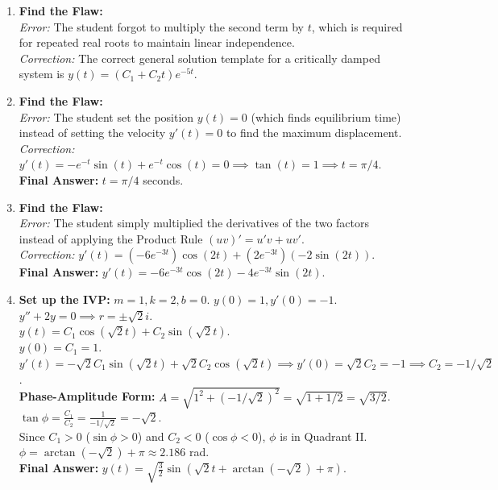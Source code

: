 \documentclass[11pt]{article}
\begin{document}
\begin{enumerate}[label=\textbf{\arabic*.}]
    \item \textbf{Find the Flaw:} \\
    \textit{Error:} The student forgot to multiply the second term by $t$, which is required for repeated real roots to maintain linear independence. \\
    \textit{Correction:} The correct general solution template for a critically damped system is \textbf{$y(t) = (C_1 + C_2 t)e^{-5t}$}.

    \item \textbf{Find the Flaw:} \\
    \textit{Error:} The student set the position $y(t) = 0$ (which finds equilibrium time) instead of setting the velocity $y'(t) = 0$ to find the maximum displacement. \\
    \textit{Correction:} $y'(t) = -e^{-t}\sin(t) + e^{-t}\cos(t) = 0 \implies \tan(t) = 1 \implies t = \pi/4$. \textbf{Final Answer:} $t = \pi/4$ seconds.

    \item \textbf{Find the Flaw:} \\
    \textit{Error:} The student simply multiplied the derivatives of the two factors instead of applying the Product Rule $(uv)' = u'v + uv'$. \\
    \textit{Correction:} $y'(t) = (-6e^{-3t})\cos(2t) + (2e^{-3t})(-2\sin(2t))$. \textbf{Final Answer:} $y'(t) = -6e^{-3t}\cos(2t) - 4e^{-3t}\sin(2t)$.

    \item \textbf{Set up the IVP:} $m=1, k=2, b=0$. $y(0) = 1, y'(0) = -1$. \\
    $y'' + 2y = 0 \implies r = \pm \sqrt{2}i$. \\
    $y(t) = C_1 \cos(\sqrt{2}t) + C_2 \sin(\sqrt{2}t)$. \\
    $y(0) = C_1 = 1$. \\
    $y'(t) = -\sqrt{2}C_1 \sin(\sqrt{2}t) + \sqrt{2}C_2 \cos(\sqrt{2}t) \implies y'(0) = \sqrt{2}C_2 = -1 \implies C_2 = -1/\sqrt{2}$. \\
    \textbf{Phase-Amplitude Form:} $A = \sqrt{1^2 + (-1/\sqrt{2})^2} = \sqrt{1 + 1/2} = \sqrt{3/2}$. \\
    $\tan \phi = \frac{C_1}{C_2} = \frac{1}{-1/\sqrt{2}} = -\sqrt{2}$. \\
    Since $C_1 > 0$ ($\sin \phi > 0$) and $C_2 < 0$ ($\cos \phi < 0$), $\phi$ is in Quadrant II. \\
    $\phi = \arctan(-\sqrt{2}) + \pi \approx 2.186$ rad. \\
    \textbf{Final Answer:} $y(t) = \sqrt{\frac{3}{2}}\sin(\sqrt{2}t + \arctan(-\sqrt{2}) + \pi)$.


\end{enumerate}
\end{document}
